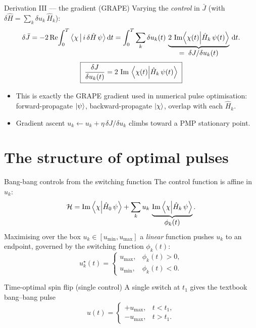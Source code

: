 \documentclass[10pt,aspectratio=169]{beamer}
\newcommand{\Hop}{\hat H}
\newcommand{\Hc}{\mathcal{H}}                 %
\renewcommand{\Re}{\operatorname{Re}}
\renewcommand{\Im}{\operatorname{Im}}
\begin{document}
\begin{frame}{Derivation III --- the gradient (GRAPE)}
  Varying the \emph{control} in $\bar J$ (with $\delta\Hop=\sum_k\delta u_k\,\Hop_k$):
  \begin{equation}
    \delta\bar J
      = -2\Re\!\int_0^T \big\langle \chi \,\big|\, i\,\delta\Hop\,\psi\big\rangle\,\dd t
      = \int_0^T \sum_k \delta u_k(t)\,
        \underbrace{2\,\Im\!\braket{\chi(t)}{\Hop_k\,\psi(t)}}_{\displaystyle =\;\delta J/\delta u_k(t)}\,\dd t .
  \end{equation}
  \begin{equation}
    \boxed{\;\frac{\delta J}{\delta u_k(t)}
      = 2\,\Im\,\braket{\chi(t)}{\Hop_k\,\psi(t)}\;}
  \end{equation}
  \begin{itemize}
    \item This is exactly the \alert{GRAPE} gradient used in numerical pulse
          optimisation: forward-propagate $\ket\psi$, backward-propagate
          $\ket\chi$, overlap with each $\Hop_k$.
    \item Gradient ascent $u_k \leftarrow u_k + \eta\,\delta J/\delta u_k$ climbs
          toward a PMP stationary point.
  \end{itemize}
\end{frame}

\section{The structure of optimal pulses}

\begin{frame}{Bang-bang controls from the switching function}
  The control function is \alert{affine} in $u_k$:
  \[
    \Hc = \Im\braket{\chi}{\Hop_0\,\psi}
        + \sum_k u_k\, \underbrace{\Im\braket{\chi}{\Hop_k\,\psi}}_{\displaystyle\phi_k(t)} .
  \]
  Maximising over the box $u_k\in[u_{\min},u_{\max}]$ a \emph{linear} function
  pushes $u_k$ to an endpoint, governed by the \alert{switching function}
  $\phi_k(t)$:
  \begin{equation}
    u_k^\star(t)=
    \begin{cases}
      u_{\max}, & \phi_k(t) > 0,\\[2pt]
      u_{\min}, & \phi_k(t) < 0.
    \end{cases}
  \end{equation}
  \begin{block}{Time-optimal spin flip (single control)}
    A single switch at $t_1$ gives the textbook bang--bang pulse
    \[
      u(t)=
      \begin{cases}
        +u_{\max}, & t<t_1,\\
        -u_{\max}, & t>t_1.
      \end{cases}
    \]
  \end{block}
\end{frame}
\end{document}
